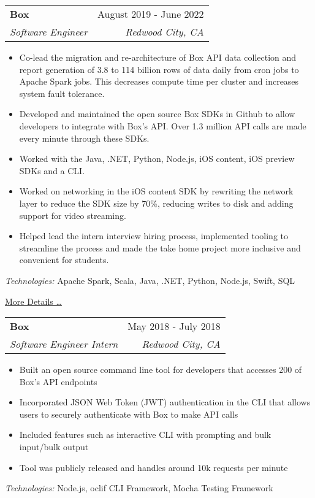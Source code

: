 \documentclass[letterpaper,10pt]{article}
\makeatletter
\newcommand{\resumeItem}[1]{
  \item\small{
    {#1 \vspace{-2pt}}
  }
}
\newcommand{\resumeSubheading}[4]{
  \vspace{-2pt}\item
    \begin{tabular*}{0.97\textwidth}[t]{l@{\extracolsep{\fill}}r}
      \textbf{#1} & #2 \\
      \textit{\small#3} & \textit{\small #4} \\
    \end{tabular*}\vspace{-7pt}
}
\newcommand{\resumeSubSubheading}[2]{
    \item
    \begin{tabular*}{0.97\textwidth}{l@{\extracolsep{\fill}}r}
      \textit{\small#1} & \textit{\small #2} \\
    \end{tabular*}\vspace{-7pt}
}
\newcommand{\resumeSubHeadingListEnd}{\end{itemize}}
\newcommand{\resumeItemListStart}{\begin{itemize}}
\newcommand{\resumeItemListEnd}{\end{itemize}\vspace{-5pt}}
\makeatother
\begin{document}
    \resumeSubheading
      {Box}{August 2019 - June 2022}
      {Software Engineer}{Redwood City, CA}
      \resumeItemListStart
        \resumeItem{Co-lead the migration and re-architecture of Box API data collection and report generation of 3.8 to 114 billion rows of data daily from cron jobs to Apache Spark jobs. This decreases compute time per cluster and increases system fault tolerance.}
        \resumeItem{Developed and maintained the open source Box SDKs in Github to allow developers to integrate with Box's API. Over 1.3 million API calls are made every minute through these SDKs.}
        \resumeItem{Worked with the Java, .NET, Python, Node.js, iOS content, iOS preview SDKs and a CLI.}
        \resumeItem{Worked on networking in the iOS content SDK by rewriting the network layer to reduce the SDK size by 70\%, reducing writes to disk and adding support for video streaming.}
        \resumeItem{Helped lead the intern interview hiring process, implemented tooling to streamline the process and made the take home project more inclusive and convenient for students.}
      \resumeItemListEnd
      \vspace{5pt}
      \emph{Technologies:} Apache Spark, Scala, Java, .NET, Python, Node.js, Swift, SQL

      \href{https://sujaygarlanka.com/experience/box/}{\underline{More Details} \ldots}
      

    \resumeSubheading
      {Box}{May 2018 - July 2018}
      {Software Engineer Intern}{Redwood City, CA}
      \resumeItemListStart
        \resumeItem{Built an open source command line tool for developers that accesses 200 of Box’s API endpoints}
        \resumeItem{Incorporated JSON Web Token (JWT) authentication in the CLI that allows users to securely authenticate with Box to make API calls}
        \resumeItem{Included features such as interactive CLI with prompting and bulk input/bulk output}
        \resumeItem{Tool was publicly released and handles around 10k requests per minute}
     \resumeItemListEnd
     \vspace{5pt}
     \emph{Technologies:} Node.js, oclif CLI Framework, Mocha Testing Framework
\end{document}
